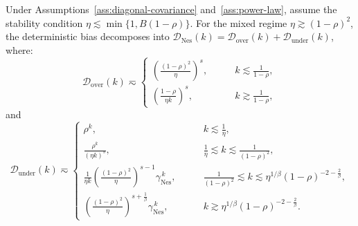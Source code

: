 \begin{proposition}
\label{prop:nes_deterministic_bias}
Under Assumptions~\ref{ass:diagonal-covariance} and~\ref{ass:power-law}, assume the stability condition $\eta\lesssim \min\{1,B(1-\rho)\}$. For the mixed regime \(\eta\gtrsim(1-\rho)^2\), the deterministic bias decomposes into $\mathcal{D}_{\mathrm{Nes}}(k) = \mathcal{D}_{\mathrm{over}}(k) + \mathcal{D}_{\mathrm{under}}(k)$, where:
\begin{equation*}
    \mathcal{D}_{\mathrm{over}}(k)
    \eqsim
    \begin{cases}
    \left(\frac{(1-\rho)^2}{\eta}\right)^s, &\qquad k\lesssim\frac{1}{1-\rho},\\
    \left(\frac{1-\rho}{\eta k}\right)^s, &\qquad k\gtrsim\frac{1}{1-\rho},
    \end{cases}
\end{equation*}
and
\begin{equation*}
    \mathcal{D}_{\mathrm{under}}(k)
    \eqsim
    \begin{cases}
    \rho^k, &\qquad k\lesssim\frac{1}{\eta},\\
    \frac{\rho^k}{(\eta k)^s}, &\qquad \frac{1}{\eta} \lesssim k \lesssim \frac{1}{(1-\rho)^2},\\
    \frac{1}{\eta k}\left(\frac{(1-\rho)^2}{\eta}\right)^{s-1}\gamma_{\mathrm{Nes}}^{\,k}, &\qquad \frac{1}{(1-\rho)^2} \lesssim k \lesssim \eta^{1/\beta}(1-\rho)^{-2-\frac{2}{\beta}},\\
    \left(\frac{(1-\rho)^2}{\eta}\right)^{s+\frac{1}{\beta}}\gamma_{\mathrm{Nes}}^{\,k}, &\qquad k \gtrsim \eta^{1/\beta}(1-\rho)^{-2-\frac{2}{\beta}}.
    \end{cases}
\end{equation*}
\end{proposition}

